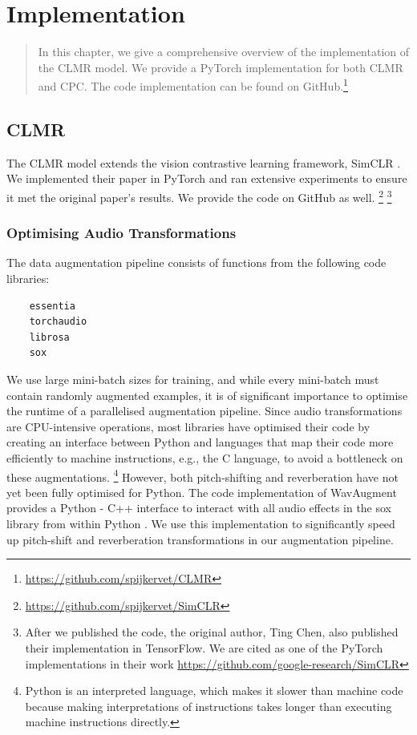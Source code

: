 \chapter{Implementation}
\begin{quote}
    In this chapter, we give a comprehensive overview of the implementation of the CLMR model. We provide a PyTorch \cite{pytorch2019} implementation for both CLMR and CPC. The code implementation can be found on GitHub.\footnote{\url{https://github.com/spijkervet/CLMR}}
\end{quote}


\section{CLMR}
The CLMR model extends the vision contrastive learning framework, SimCLR \cite{chen_simple_2020}. We implemented their paper in PyTorch and ran extensive experiments to ensure it met the original paper's results.
We provide the code on GitHub as well.
\footnote{\url{https://github.com/spijkervet/SimCLR}}
\footnote{After we published the code, the original author, Ting Chen, also published their implementation in TensorFlow. We are cited as one of the PyTorch implementations in their work \url{https://github.com/google-research/SimCLR}}

\subsection{Optimising Audio Transformations}
The data augmentation pipeline consists of functions from the following code libraries:
\begin{verbatim}
    essentia
    torchaudio
    librosa
    sox
\end{verbatim}
We use large mini-batch sizes for training, and while every mini-batch must contain randomly augmented examples, it is of significant importance to optimise the runtime of a parallelised augmentation pipeline.
Since audio transformations are CPU-intensive operations, most libraries have optimised their code by creating an interface between Python and languages that map their code more efficiently to machine instructions, e.g., the C language, to avoid a bottleneck on these augmentations.
\footnote{Python is an interpreted language, which makes it slower than machine code because making interpretations of instructions takes longer than executing machine instructions directly.}
However, both pitch-shifting and reverberation have not yet been fully optimised for Python. The code implementation of WavAugment provides a Python - C++ interface to interact with all audio effects in the sox library from within Python \cite{wavaugment2020}.
We use this implementation to significantly speed up pitch-shift and reverberation transformations in our augmentation pipeline.

